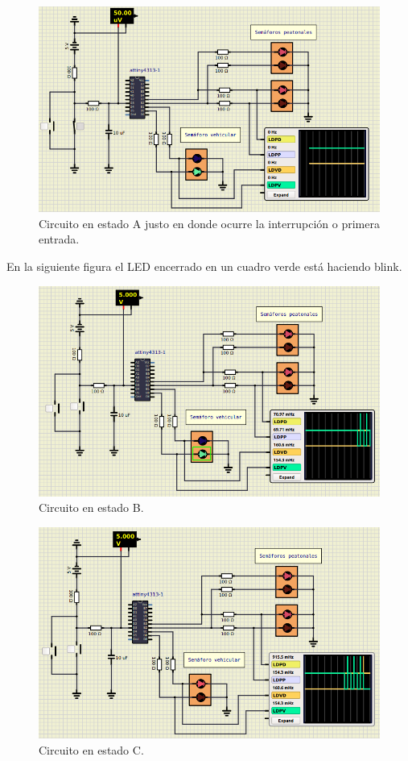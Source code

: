 \begin{figure}[H]
\centering
\includegraphics[scale=0.8]{./images/A1.png} 
\caption{Circuito en estado A justo en donde ocurre la interrupción o primera entrada.}
\label{f1}
\end{figure}

En la siguiente figura el LED encerrado en un cuadro verde está haciendo blink.
\begin{figure}[H]
\centering
\includegraphics[scale=0.76]{./images/B.png} 
\caption{Circuito en estado B.}
\label{f1}
\end{figure}


\begin{figure}[H]
\centering
\includegraphics[scale=0.76]{./images/C.png} 
\caption{Circuito en estado C.}
\label{f1}
\end{figure}


